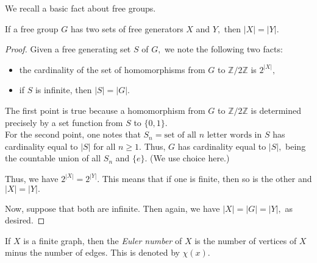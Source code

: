 \documentclass[12pt]{article}
\begin{document}
We recall a basic fact about free groups.

\begin{thm} \label{thm:cardofgenset}
	If a free group $G$ has two sets of free generators $X$ and $Y,$ then $|X| = |Y|.$
\end{thm}
\begin{proof} 
	Given a free generating set $S$ of $G,$ we note the following two facts:
	\begin{itemize}
		\item the cardinality of the set of homomorphisms from $G$ to $\mathbb{Z}/2\mathbb{Z}$ is $2^{|X|},$
		\item if $S$ is infinite, then $|S| = |G|.$	
	\end{itemize}
	The first point is true because a homomorphism from $G$ to $\mathbb{Z}/2\mathbb{Z}$ is determined precisely by a set function from $S$ to $\{0, 1\}.$\\
	For the second point, one notes that $S_n = \text{set of all $n$ letter words in $S$}$ has cardinality equal to $|S|$ for all $n \ge 1.$ Thus, $G$ has cardinality equal to $|S|,$ being the countable union of all $S_n$ and $\{e\}.$ (We use choice here.)

	Thus, we have $2^{|X|} = 2^{|Y|}.$ This means that if one is finite, then so is the other and $|X| = |Y|.$

	Now, suppose that both are infinite. Then again, we have $|X| = |G| = |Y|,$ as desired.
\end{proof}

\begin{defn}
	If $X$ is a finite graph, then the \emph{Euler number} of $X$ is the number of vertices of $X$ minus the number of edges. This is denoted by $\chi(x).$
\end{defn}
\end{document}
